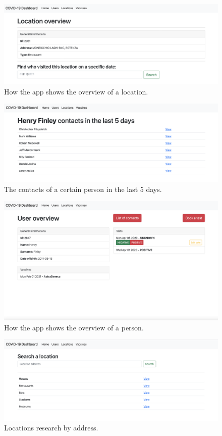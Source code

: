 \documentclass{article}
\begin{document}
\begin{figure}[ht!]
    \centering
    \includegraphics[scale=0.3]{smbud-contact tracing app latex code/screenshots/locationoverview.png}
    \caption{How the app shows the overview of a location.}
\end{figure}
\begin{figure}[ht!]
    \centering
    \includegraphics[scale=0.3]{smbud-contact tracing app latex code/screenshots/personcontacts.png}
    \caption{The contacts of a certain person in the last 5 days.}
\end{figure}
\begin{figure}[ht!]
    \centering
    \includegraphics[scale=0.3]{smbud-contact tracing app latex code/screenshots/personoverview.png}
    \caption{How the app shows the overview of a person.}
\end{figure}
\begin{figure}[ht!]
    \centering
    \includegraphics[scale=0.3]{smbud-contact tracing app latex code/screenshots/searchlocation.png}
    \caption{Locations research by address.}
\end{figure}
\end{document}
